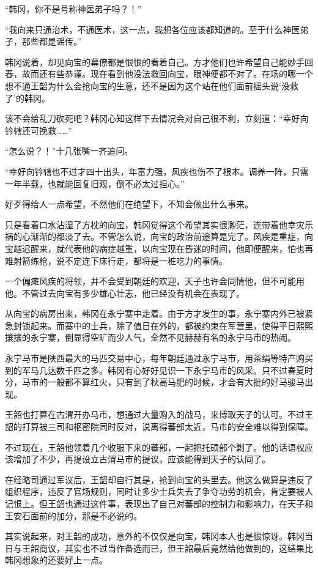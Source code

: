 “韩冈，你不是号称神医弟子吗？！”

“我向来只通治术，不通医术，这一点，我想各位应该都知道的。至于什么神医弟子，那些都是谣传。”

韩冈说着，却见向宝的幕僚都是恨恨的看着自己。方才他们也许希望自己能妙手回春，故而还有些恭谨。现在看到他没法救回向宝，眼神便都不对了。在场的哪一个想不通王韶为什么会抢向宝的生意，还不是因为这个站在他们面前摇头说‘没救了’的韩冈。

该不会给乱刀砍死吧？韩冈心知这样下去情况会对自己很不利，立刻道：“幸好向钤辖还可挽救……”

“怎么说？！”十几张嘴一齐追问。

“幸好向钤辖也不过才四十出头，年富力强，风疾也伤不了根本。调养一阵，只需一年半载，也就能回复旧观，倒不必太过担心。”

好歹得给人一点希望，不然他们在绝望下，不知会做出什么事来。

只是看着口水沾湿了方枕的向宝，韩冈觉得这个希望其实很渺茫，连带着他幸灾乐祸的心渐渐的都淡了去。不管怎么说，向宝的政治前途算是完了。风疾是重症，向宝越迟醒来，就代表他的病症越重，以向宝现在昏迷的时间，他即便醒来，怕也再难射箭练枪，说不定连下床行走，都将是一桩吃力的事情。

一个偏瘫风疾的将领，并不会受到朝廷的欢迎，天子也许会同情他，但不可能用他。不管过去向宝有多少雄心壮志，他已经没有机会在表现了。

从向宝的病房出来，韩冈在永宁寨中走着。由于方才发生的事，永宁寨内外已被紧急封锁起来。而寨中的士兵，除了值日在外的，都被约束在军营里，使得平日熙熙攘攘的永宁寨，倒显得空旷而少人气，全然不见赫赫有名的永宁马市的热闹。

永宁马市是陕西最大的马匹交易中心，每年朝廷通过永宁马市，用茶绢等特产购买到的军马几达数千匹之多。韩冈有心好好见识一下永宁马市的风采。只不过春夏时分，马市的一般都不算红火，只有到了秋高马肥的时候，才会有大批的好马骏马出现。

王韶也打算在古渭开办马市，想通过大量购入的战马，来博取天子的认可。不过王韶的打算被三司和枢密院同时反对，说离得蕃部太近，马市的安全难以得到保障。

不过现在，王韶他领着几个收服下来的蕃部，一起把托硕部个剿了。他的话语权应该增加了不少，再提设立古渭马市的提议，应该能得到天子的认同了。

在经略司通过军议后，王韶却自行其是，抢到向宝的头里去。他这么做算是违反了组织程序，违反了官场规则，同时让多少士兵失去了争夺功劳的机会，肯定要被人记恨上。但王韶也通过这件事，表现出了自己对蕃部的控制力和影响力，在天子和王安石面前的加分，那是不必说的。

其实说起来，对王韶的成功，意外的不仅仅是向宝，韩冈本人也是很惊讶。韩冈当日与王韶商议，其实也不过当作备选而已，但王韶最后竟然给他做到的，这结果比韩冈想象的还要好上一点。

